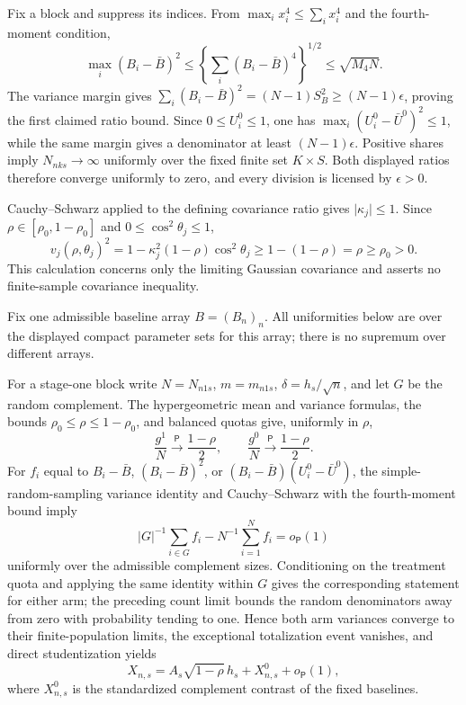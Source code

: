 Fix a block and suppress its indices.  From \(\max_i x_i^4\le\sum_i x_i^4\) and the fourth-moment condition,
\[
\max_i(B_i-\bar B)^2
\le\left\{\sum_i(B_i-\bar B)^4\right\}^{1/2}
\le\sqrt{M_4N}.
\]
The variance margin gives \(\sum_i(B_i-\bar B)^2=(N-1)S_B^2\ge(N-1)\epsilon\), proving the first claimed ratio bound.  Since \(0\le U_i^0\le1\), one has \(\max_i(U_i^0-\bar U^0)^2\le1\), while the same margin gives a denominator at least \((N-1)\epsilon\).  Positive shares imply \(N_{nks}\to\infty\) uniformly over the fixed finite set \(K\times S\).  Both displayed ratios therefore converge uniformly to zero, and every division is licensed by \(\epsilon>0\).

Cauchy--Schwarz applied to the defining covariance ratio gives \(\lvert\kappa_j\rvert\le1\).  Since \(\rho\in[\rho_0,1-\rho_0]\) and \(0\le\cos^2\theta_j\le1\),
\[
v_j(\rho,\theta_j)^2
=1-\kappa_j^2(1-\rho)\cos^2\theta_j
\ge1-(1-\rho)=\rho\ge\rho_0>0.
\]
This calculation concerns only the limiting Gaussian covariance and asserts no finite-sample covariance inequality.

Fix one admissible baseline array \(B=(B_n)_n\).  All uniformities below are over the displayed compact parameter sets for this array; there is no supremum over different arrays.

For a stage-one block write \(N=N_{n1s}\), \(m=m_{n1s}\), \(\delta=h_s/\sqrt n\), and let \(G\) be the random complement.  The hypergeometric mean and variance formulas, the bounds \(\rho_0\le\rho\le1-\rho_0\), and balanced quotas give, uniformly in \(\rho\),
\[
\frac{g^1}{N}\xrightarrow{\mathsf P}\frac{1-\rho}{2},
\qquad
\frac{g^0}{N}\xrightarrow{\mathsf P}\frac{1-\rho}{2}.
\]
For \(f_i\) equal to \(B_i-\bar B\), \((B_i-\bar B)^2\), or \((B_i-\bar B)(U_i^0-\bar U^0)\), the simple-random-sampling variance identity and Cauchy--Schwarz with the fourth-moment bound imply
\[
|G|^{-1}\sum_{i\in G}f_i-N^{-1}\sum_{i=1}^Nf_i=o_{\mathsf P}(1)
\]
uniformly over the admissible complement sizes.  Conditioning on the treatment quota and applying the same identity within \(G\) gives the corresponding statement for either arm; the preceding count limit bounds the random denominators away from zero with probability tending to one.  Hence both arm variances converge to their finite-population limits, the exceptional totalization event vanishes, and direct studentization yields
\[
X_{n,s}=A_s\sqrt{1-\rho}\,h_s+X^0_{n,s}+o_{\mathsf P}(1),
\]
where \(X^0_{n,s}\) is the standardized complement contrast of the fixed baselines.

